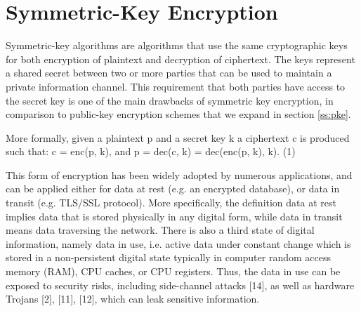 \section{Symmetric-Key Encryption}
Symmetric-key algorithms are algorithms that use the same cryptographic keys for both encryption of plaintext and decryption of ciphertext.
The keys represent a shared secret between two or more parties that can be used to maintain a private information channel.
This requirement that both parties have access to the secret key is one of the main drawbacks of symmetric key encryption, in comparison to public-key encryption schemes that we expand in section \ref{ss:pke}.

More formally, given a plaintext p and a secret key k a ciphertext c is produced such that:
c = enc(p, k), and p = dec(c, k) = dec(enc(p, k), k). (1)

This form of encryption has been widely adopted by numerous applications, and can be applied either for data at rest (e.g. an encrypted database), or data in transit (e.g. TLS/SSL protocol).
More specifically, the definition data at rest implies data that is stored physically in any digital form, while data in transit means data traversing the network.
There is also a third state of digital information, namely data in use, i.e. active data under constant change which is stored in a non-persistent digital state typically in computer random access memory (RAM), CPU caches, or CPU registers.
Thus, the data in use can be exposed to security risks, including side-channel attacks [14], as well as hardware Trojans [2], [11], [12], which can leak sensitive information.
